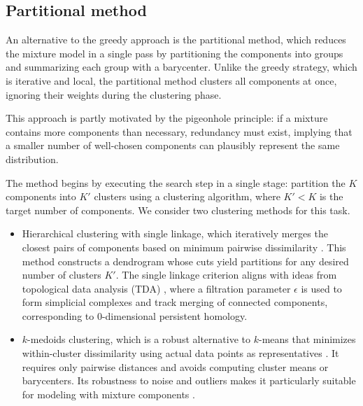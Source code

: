 \documentclass[10pt]{article}
\begin{document}
\subsection{Partitional method}


An alternative to the greedy approach is the partitional method, which reduces the mixture model in a single pass by partitioning the components into groups and summarizing each group with a barycenter. Unlike the greedy strategy, which is iterative and local, the partitional method clusters all components at once, ignoring their weights during the clustering phase.

This approach is partly motivated by the pigeonhole principle: if a mixture contains more components than necessary, redundancy must exist, implying that a smaller number of well-chosen components can plausibly represent the same distribution.

The method begins by executing the \textsf{search} step in a single stage: partition the $K$ components into $K'$ clusters using a clustering algorithm, where $K' < K$ is the target number of components. We consider two clustering methods for this task. 
\begin{itemize}
	\item Hierarchical clustering with single linkage, which iteratively merges the closest pairs of components based on minimum pairwise dissimilarity \citep{johnson_1967_HierarchicalClusteringSchemes, gower_1969_MinimumSpanningTrees}. This method constructs a dendrogram whose cuts yield partitions for any desired number of clusters $K'$. The single linkage criterion aligns with ideas from topological data analysis (TDA) \citep{carlsson_2004_PersistenceBarcodesShapes, chazal_2021_IntroductionTopologicalData}, where a filtration parameter $\epsilon$ is used to form simplicial complexes and track merging of connected components, corresponding to 0-dimensional persistent homology.
	\item $k$-medoids clustering, which is a robust alternative to $k$-means that minimizes within-cluster dissimilarity using actual data points as representatives \citep{kaufman_1990_PartitioningMedoidsProgram}. It requires only pairwise distances and avoids computing cluster means or barycenters. Its robustness to noise and outliers makes it particularly suitable for modeling with mixture components \citep{huber_1981_RobustStatistics}.
\end{itemize}
\end{document}
